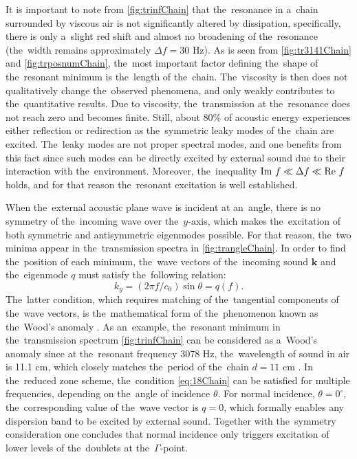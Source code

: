 It is important to note from \cref{fig:trinfChain} that the~resonance in a~chain surrounded by viscous air is not significantly altered by dissipation, specifically, there is only a~slight red shift and almost no broadening of the~resonance (the~width remains approximately $\Delta f=30$ Hz).
As is seen from \cref{fig:tr3141Chain} and \cref{fig:trposnumChain}, the~most important factor defining the~shape of the~resonant minimum is the~length of the~chain.
The~viscosity is then does not qualitatively change the~observed phenomena, and only weakly contributes to the~quantitative results.
Due to viscosity, the~transmission at the~resonance does not reach zero and becomes finite.
Still, about $80\%$ of acoustic energy experiences either reflection or redirection as the~symmetric leaky modes of the~chain are excited.
The~leaky modes are not proper spectral modes, and one benefits from this fact since such modes can be directly excited by external sound due to their interaction with the~environment.
Moreover, the~inequality $\textrm{Im } f \ll \Delta f \ll \textrm{Re } f$ holds, and for that reason the~resonant excitation is well established.


When the~external acoustic plane wave is incident at an~angle, there is no symmetry of the~incoming wave over the~$y$-axis, which makes the~excitation of both symmetric and antisymmetric eigenmodes possible.
For that reason, the~two minima appear in the~transmission spectra in \cref{fig:trangleChain}.
In order to find the~position of each minimum, the~wave vectors of the~incoming sound $\mathbf{k}$ and the~eigenmode $q$ must satisfy the~following relation:
\begin{equation}
\label{eq:18Chain}
k_{y}=(2\pi f/c_0) \sin \theta = q(f).
\end{equation}
The~latter condition, which requires matching of the~tangential components of the~wave vectors, is the~mathematical form of the~phenomenon known as the~Wood's anomaly \cite{maystre}.
As an~example, the~resonant minimum in the~transmission spectrum \cref{fig:trinfChain} can be considered as a~Wood's anomaly since at the~resonant frequency 3078 Hz, the~wavelength of sound in air is 11.1 cm, which closely matches the~period of the~chain $d=11$ cm \cite{garcia1}.
In the~reduced zone scheme, the~condition \cref{eq:18Chain} can be satisfied for multiple frequencies, depending on the~angle of incidence $\theta$.
For normal incidence, $\theta=0^{\circ}$, the~corresponding value of the~wave vector is $q=0$, which formally enables any dispersion band to be excited by external sound.
Together with the~symmetry consideration one concludes that normal incidence only triggers excitation of lower levels of the~doublets at the~$\Gamma$-point.

